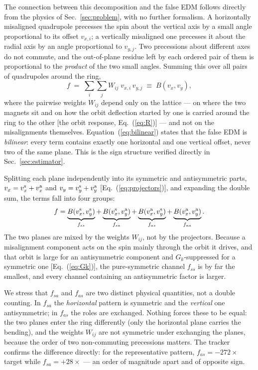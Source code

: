 \documentclass[aps,prab,reprint,superscriptaddress,nofootinbib]{revtex4-2}
\begin{document}
The connection between this decomposition and the false EDM follows directly
from the physics of Sec.~\ref{sec:problem}, with no further formalism.  A
horizontally misaligned quadrupole precesses the spin about the vertical axis
by a small angle proportional to its offset $v_{x,i}$; a vertically
misaligned one precesses it about the radial axis by an angle proportional to
$v_{y,j}$.  Two precessions about different axes do not commute, and the
out-of-plane residue left by each ordered pair of them is proportional to the
\emph{product} of the two small angles.  Summing this over all pairs of
quadrupoles around the ring,
\begin{equation}
  f \;=\; \sum_{i}\sum_{j} W_{ij}\; v_{x,i}\, v_{y,j}
  \;\equiv\; B(v_x, v_y),
  \label{eq:bilinear}
\end{equation}
where the pairwise weights $W_{ij}$ depend only on the lattice --- on where
the two magnets sit and on how the orbit deflection started by one is carried
around the ring to the other [the orbit response, Eq.~(\ref{eq:R})] --- and
not on the
misalignments themselves.  Equation~(\ref{eq:bilinear}) states that the false
EDM is \emph{bilinear}: every term contains exactly one horizontal and one
vertical offset, never two of the same plane.  This is the sign structure
verified directly in Sec.~\ref{sec:estimator}.

Splitting each plane independently into its symmetric and antisymmetric parts,
$v_x = v_x^{\rm s} + v_x^{\rm a}$ and $v_y = v_y^{\rm s} + v_y^{\rm a}$
[Eq.~(\ref{eq:projectors})], and expanding the double sum, the terms fall
into four groups:
\begin{equation}
  f = \underbrace{B(v_x^{\rm s},v_y^{\rm s})}_{f_{ss}}
    + \underbrace{B(v_x^{\rm s},v_y^{\rm a})}_{f_{sa}}
    + \underbrace{B(v_x^{\rm a},v_y^{\rm s})}_{f_{as}}
    + \underbrace{B(v_x^{\rm a},v_y^{\rm a})}_{f_{aa}} .
  \label{eq:channels}
\end{equation}
The two planes are mixed by the weights $W_{ij}$, not by the projectors.
Because a misalignment component acts on the spin mainly through the orbit it
drives, and that orbit is large for an antisymmetric component and
$G_k$-suppressed for a symmetric one [Eq.~(\ref{eq:Gk})], the pure-symmetric
channel $f_{ss}$ is by far the smallest, and every channel containing an
antisymmetric factor is larger.

We stress that $f_{sa}$ and $f_{as}$ are two distinct physical quantities,
not a double counting.  In $f_{sa}$ the \emph{horizontal} pattern is
symmetric and the \emph{vertical} one antisymmetric; in $f_{as}$ the roles
are exchanged.  Nothing forces these to be equal: the two planes enter the
ring differently (only the horizontal plane carries the bending), and the
weights $W_{ij}$ are not symmetric under exchanging the planes, because the
order of two non-commuting precessions matters.  The tracker confirms the
difference directly: for the representative pattern, $f_{as} = -272\times$
target while $f_{sa} = +28\times$ --- an order of magnitude apart and of
opposite sign.
\end{document}
